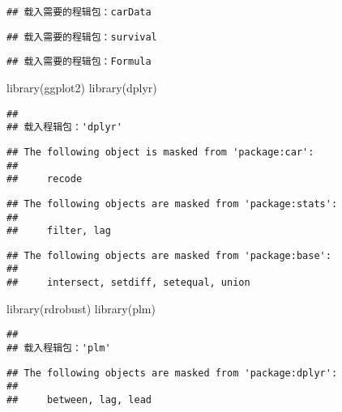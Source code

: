\documentclass[
]{article}
\newenvironment{Shaded}{\begin{snugshade}}{\end{snugshade}}
\newcommand{\FunctionTok}[1]{\textcolor[rgb]{0.00,0.00,0.00}{#1}}
\newcommand{\NormalTok}[1]{#1}
\begin{document}
\begin{verbatim}
## 载入需要的程辑包：carData
\end{verbatim}

\begin{verbatim}
## 载入需要的程辑包：survival
\end{verbatim}

\begin{verbatim}
## 载入需要的程辑包：Formula
\end{verbatim}

\begin{Shaded}
\begin{Highlighting}[]
\FunctionTok{library}\NormalTok{(ggplot2)}
\FunctionTok{library}\NormalTok{(dplyr)}
\end{Highlighting}
\end{Shaded}

\begin{verbatim}
## 
## 载入程辑包：'dplyr'
\end{verbatim}

\begin{verbatim}
## The following object is masked from 'package:car':
## 
##     recode
\end{verbatim}

\begin{verbatim}
## The following objects are masked from 'package:stats':
## 
##     filter, lag
\end{verbatim}

\begin{verbatim}
## The following objects are masked from 'package:base':
## 
##     intersect, setdiff, setequal, union
\end{verbatim}

\begin{Shaded}
\begin{Highlighting}[]
\FunctionTok{library}\NormalTok{(rdrobust)}
\FunctionTok{library}\NormalTok{(plm)}
\end{Highlighting}
\end{Shaded}

\begin{verbatim}
## 
## 载入程辑包：'plm'
\end{verbatim}

\begin{verbatim}
## The following objects are masked from 'package:dplyr':
## 
##     between, lag, lead
\end{verbatim}
\end{document}
